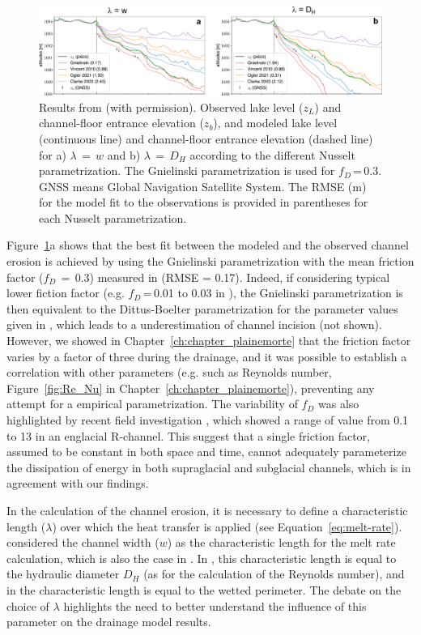 \begin{figure}[h]
    \centering
    \includegraphics[width=1\textwidth]{chapters/Discussion/Bossons_models.pdf}
    \caption{Results from \cite{Gagliardini&al2024} (with permission). Observed lake level ($z_L$) and channel-floor entrance elevation ($z_b$), and modeled lake level (continuous line) and channel-floor entrance elevation (dashed line) for a) $\lambda\,=\,w$ and b) $\lambda\,=\,D_H$ according to the different Nusselt parametrization. The Gnielinski parametrization is used for $f_D$\,=\,0.3. GNSS means Global Navigation Satellite System. The RMSE (m) for the model fit to the observations is provided in parentheses for each Nusselt parametrization.}
    \label{fig:gag_nusselt}
\end{figure}


Figure~\ref{fig:gag_nusselt}a shows that the best fit between the modeled and the observed channel erosion is achieved by using the Gnielinski parametrization with the mean friction factor ($f_D\,=\,0.3$) measured in \cite{Ogier&al2021} (RMSE = 0.17). Indeed, if considering typical lower fiction factor (e.g. $f_D$\,=\,0.01 to 0.03 in \cite{Ancey&al2019}), the Gnielinski parametrization is then equivalent to the Dittus-Boelter parametrization for the parameter values given in \cite{Clarke2003}, which leads to a underestimation of channel incision (not shown). However, we showed in Chapter~\ref{ch:chapter_plainemorte} that the friction factor varies by a factor of three during the drainage, and it was possible to establish a correlation with other parameters (e.g. such as Reynolds number, Figure~\ref{fig:Re_Nu} in Chapter~\ref{ch:chapter_plainemorte}), preventing any attempt for a empirical parametrization. The variability of $f_D$ was also highlighted by recent field investigation \citep{pohle&&2022}, which showed a range of value from 0.1 to 13 in an englacial R-channel. This suggest that a single friction factor, assumed to be constant in both space and time, cannot adequately parameterize the dissipation of energy in both supraglacial and subglacial channels, which is in agreement with our findings.

In the calculation of the channel erosion, it is necessary to define a characteristic length ($\lambda$) over which the heat transfer is applied (see Equation~\ref{eq:melt-rate}). \cite{Gagliardini&al2024} considered the channel width ($w$) as the characteristic length for the melt rate calculation, which is also the case in \cite{Vincent&al2010}. In \cite{Clarke2003,Ogier&al2021,Sommers&Rajaram2020}, this characteristic length is equal to the hydraulic diameter $D_H$ (as for the calculation of the Reynolds number), and in \cite{Walder&Costa1996} the characteristic length is equal to the wetted perimeter. The debate on the choice of $\lambda$ highlights the need to better understand the influence of this parameter on the drainage model results.

